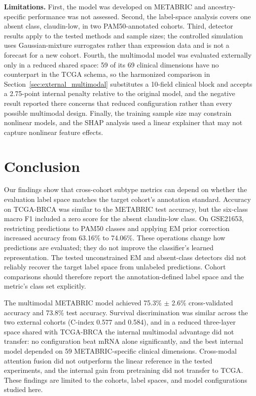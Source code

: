 \documentclass[11pt,a4paper]{article}
\begin{document}
\textbf{Limitations.} First, the model was developed on METABRIC and ancestry-specific performance was not assessed. Second, the label-space analysis covers one absent class, claudin-low, in two PAM50-annotated cohorts. Third, detector results apply to the tested methods and sample sizes; the controlled simulation uses Gaussian-mixture surrogates rather than expression data and is not a forecast for a new cohort. Fourth, the multimodal model was evaluated externally only in a reduced shared space: 59 of its 69 clinical dimensions have no counterpart in the TCGA schema, so the harmonized comparison in Section~\ref{sec:external_multimodal} substitutes a 10-field clinical block and accepts a 2.75-point internal penalty relative to the original model, and the negative result reported there concerns that reduced configuration rather than every possible multimodal design. Finally, the training sample size may constrain nonlinear models, and the SHAP analysis used a linear explainer that may not capture nonlinear feature effects.

\section{Conclusion}
\label{sec:conclusion}

Our findings show that cross-cohort subtype metrics can depend on whether the evaluation label
space matches the target cohort's annotation standard. Accuracy on TCGA-BRCA was similar to the
METABRIC test accuracy, but the six-class macro F1 included a zero score for the absent
claudin-low class. On GSE21653, restricting predictions to PAM50 classes and applying EM prior
correction increased accuracy from 63.16\% to 74.06\%. These operations change how predictions
are evaluated; they do not improve the classifier's learned representation. The tested
unconstrained EM and absent-class detectors did not reliably recover the target label space from
unlabeled predictions. Cohort comparisons should therefore report the annotation-defined label
space and the metric's class set explicitly.

The multimodal METABRIC model achieved 75.3\% $\pm$ 2.6\% cross-validated accuracy and 73.8\%
test accuracy. Survival discrimination was similar across the two external cohorts (C-index 0.577
and 0.584), and in a reduced three-layer space shared with TCGA-BRCA the internal multimodal
advantage did not transfer: no configuration beat mRNA alone significantly, and the best
internal model depended on 59 METABRIC-specific clinical dimensions. Cross-modal attention fusion did not outperform the linear reference in
the tested experiments, and the internal gain from pretraining did not transfer to TCGA. These
findings are limited to the cohorts, label spaces, and model configurations studied here.
\end{document}
